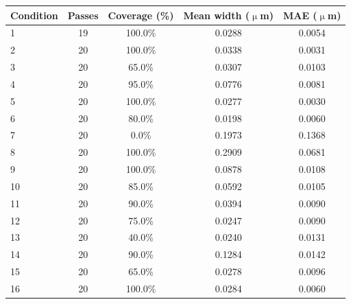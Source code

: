 \begin{tabular}{@{}lcccc@{}}
\toprule
Condition & Passes & Coverage (\%) & Mean width ($\upmu$m) & MAE ($\upmu$m) \\
\midrule
1 & 19 & 100.0\% & 0.0288 & 0.0054 \\
2 & 20 & 100.0\% & 0.0338 & 0.0031 \\
3 & 20 & 65.0\% & 0.0307 & 0.0103 \\
4 & 20 & 95.0\% & 0.0776 & 0.0081 \\
5 & 20 & 100.0\% & 0.0277 & 0.0030 \\
6 & 20 & 80.0\% & 0.0198 & 0.0060 \\
7 & 20 & 0.0\% & 0.1973 & 0.1368 \\
8 & 20 & 100.0\% & 0.2909 & 0.0681 \\
9 & 20 & 100.0\% & 0.0878 & 0.0108 \\
10 & 20 & 85.0\% & 0.0592 & 0.0105 \\
11 & 20 & 90.0\% & 0.0394 & 0.0090 \\
12 & 20 & 75.0\% & 0.0247 & 0.0090 \\
13 & 20 & 40.0\% & 0.0240 & 0.0131 \\
14 & 20 & 90.0\% & 0.1284 & 0.0142 \\
15 & 20 & 65.0\% & 0.0278 & 0.0096 \\
16 & 20 & 100.0\% & 0.0284 & 0.0060 \\
\bottomrule
\end{tabular}

